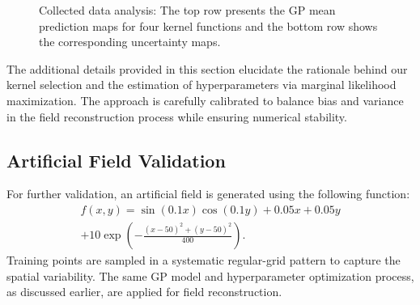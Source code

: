 \documentclass[conference]{IEEEtran}
\begin{document}
\begin{figure*}[!t]
    \centering
    \hfill
    \hfill
    \hfill
    \vspace{1em}
    \hfill
    \hfill
    \hfill
    \caption{Collected data analysis: The top row presents the GP mean prediction maps for four kernel functions and the bottom row shows the corresponding uncertainty maps.}
    \label{fig:maps}
\end{figure*}

    The additional details provided in this section elucidate the rationale behind our kernel selection and the estimation of hyperparameters via marginal likelihood maximization. 
    The approach is carefully calibrated to balance bias and variance in the field reconstruction process while ensuring numerical stability.

\subsection{Artificial Field Validation}

    For further validation, an artificial field is generated using the following function:
\begin{multline}
    f(x,y) = \sin(0.1x)\cos(0.1y) + 0.05x + 0.05y \\ 
    + 10\exp\left(-\frac{(x-50)^2+(y-50)^2}{400}\right).
\end{multline}
    Training points are sampled in a systematic regular-grid pattern to capture the spatial variability. 
    The same GP model and hyperparameter optimization process, as discussed earlier, are applied for field reconstruction.
\end{document}
